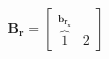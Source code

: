 \documentclass[preview]{standalone}
\begin{document}
\begin{align*}
{\mathbf{B_{r}} = \begin{bmatrix} \overbrace{1}^{\mathbf{b}_{\mathbf{r_x}}}&  2 \end{bmatrix}}
\end{align*}
\end{document}
